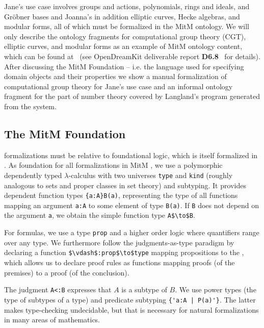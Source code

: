 Jane's use case involves groups and actions, polynomials, rings and ideals, and Gröbner bases and Joanna's in addition elliptic curves, Hecke algebras, and modular forms, all of which must be formalized in the MitM ontology.
We will only describe the ontology fragments for computational group theory (CGT), elliptic curves, and modular forms as an example of MitM ontology content, which can be found at~\cite{mitm:groups:on} (see OpenDreamKit deliverable report \textbf{D6.8}~\cite{ODK-D6.8} for details). After discussing the MitM Foundation -- i.e. the language used for specifying domain objects and their properties we show a manual formalization of computational group theory for Jane's use case and an informal ontology fragment for the part of number theory covered by Langland's program generated from the \LMFDB system. 

\subsection{The MitM Foundation}

\OMMT formalizations must be relative to foundational logic, which is itself formalized in \OMMT.
As foundation for all formalizations in MitM \cite{mitm:foundation:on}, we use a polymorphic dependently typed $\lambda$-calculus with two universes \lstinline|type| and \lstinline|kind| (roughly analogous to sets and proper classes in set theory) and subtyping.
It provides dependent function types \lstinline|{a:A}B(a)|, representing the type of all functions mapping an argument \lstinline|a:A| to some element of type \lstinline|B(a)|. If \lstinline|B| does not depend on the argument \lstinline|a|, we obtain the simple function type \lstinline[mathescape]|A$\to$B|.

For formulas, we use a type \lstinline|prop| and a higher order logic where quantifiers range over any type.
We furthermore follow the judgments-as-type paradigm by declaring a function \lstinline[mathescape]|$\vdash$:prop$\to$type| mapping propositions to the , which allows us to declare proof rules as functions mapping proofs (of the premises) to a proof (of the conclusion).

The judgment \lstinline|A<:B| expresses that $A$ is a subtype of $B$.
We use power types (the type of subtypes of a type) and predicate subtyping \lstinline?{'a:A | P(a)'}?.
The latter makes type-checking undecidable, but that is necessary for natural formalizations in many areas of mathematics.

